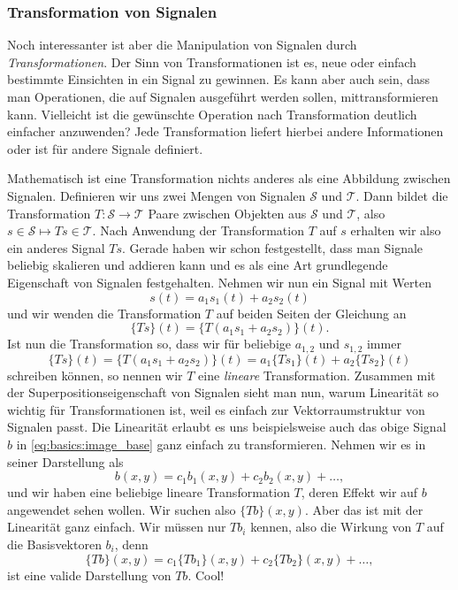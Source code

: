 \subsubsection{Transformation von Signalen}
%
Noch interessanter ist aber die Manipulation von Signalen durch \emph{Transformationen}.
Der Sinn von Transformationen ist es, neue oder einfach bestimmte Einsichten in ein Signal zu gewinnen.
Es kann aber auch sein, dass man Operationen, die auf Signalen ausgeführt werden sollen,  mittransformieren kann.
Vielleicht ist die gewünschte Operation nach Transformation deutlich einfacher anzuwenden?
Jede Transformation liefert hierbei andere Informationen oder ist für andere Signale definiert.

Mathematisch ist eine Transformation nichts anderes als eine Abbildung zwischen Signalen.
Definieren wir uns zwei Mengen von Signalen $\mathcal{S}$ und $\mathcal{T}$.
Dann bildet die Transformation $T: \mathcal{S} \rightarrow \mathcal{T}$ Paare zwischen Objekten aus $\mathcal{S}$ und $\mathcal{T}$, also $s \in \mathcal{S} \mapsto Ts \in \mathcal{T}$.
Nach Anwendung der Transformation $T$ auf $s$ erhalten wir also ein anderes Signal $Ts$.
Gerade haben wir schon festgestellt, dass man Signale beliebig skalieren und addieren kann und es als eine Art grundlegende Eigenschaft von Signalen festgehalten.
Nehmen wir nun ein Signal mit Werten
\[
    s(t) = a_1 s_1(t) + a_2 s_2(t)
\] 
und wir wenden die Transformation $T$ auf beiden Seiten der Gleichung an
\[
    \{Ts\}(t) = \{T (a_1 s_1 + a_2 s_2)\}(t).
\]
Ist nun die Transformation so, dass wir für beliebige $a_{1,2}$ und $s_{1,2}$ immer
\begin{equation}\label{eq:basics:trafo_linear}
    \{Ts\}(t) = \{T (a_1 s_1 + a_2 s_2)\}(t) = a_1 \{Ts_1\}(t) + a_2 \{Ts_2\}(t)
\end{equation}
schreiben können, so nennen wir $T$ eine \emph{lineare} Transformation.
Zusammen mit der Superpositionseigenschaft von Signalen sieht man nun, warum
Linearität so wichtig für Transformationen ist, weil es einfach zur Vektorraumstruktur von Signalen passt.
Die Linearität erlaubt es uns beispielsweise auch das obige Signal $b$ in \eqref{eq:basics:image_base} ganz einfach zu transformieren.
Nehmen wir es in seiner Darstellung als
\[
    b(x,y) = c_1 b_1(x,y) + c_2 b_2(x,y) + \dots,
\]
und wir haben eine beliebige lineare Transformation $T$, deren Effekt wir auf $b$ angewendet sehen wollen. 
Wir suchen also $\{Tb\}(x,y)$.
Aber das ist mit der Linearität ganz einfach. Wir müssen nur $Tb_i$ kennen, also die Wirkung von $T$ auf die Basisvektoren $b_i$, denn
\[
    \{Tb\}(x,y) = c_1 \{Tb_1\}(x,y) + c_2 \{Tb_2\}(x,y) + \dots,
\]
ist eine valide Darstellung von $Tb$.
Cool!

